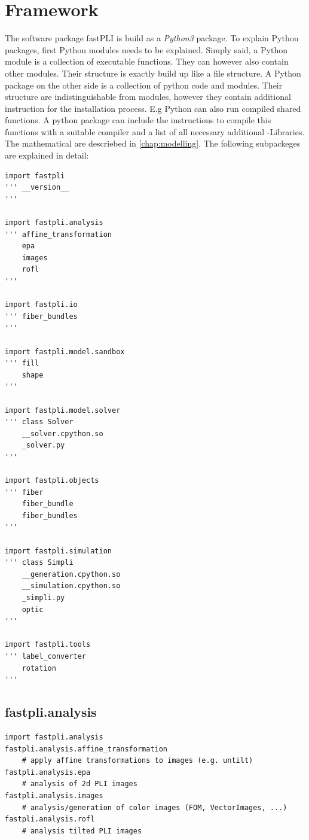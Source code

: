 \section{Framework}
The software package \ac{fastPLI} \cite{fastpli} is build as a \textit{Python3} \cite{Python3} package.
% 
To explain Python packages, first Python modules needs to be explained.
% 
Simply said, a Python module is a collection of executable functions.
They can however also contain other modules.
Their structure is exactly build up like a file structure. 
% 
A Python package on the other side is a collection of python code and modules.
Their structure are indistinguishable from modules, however they contain additional instruction for the installation process.
E.g Python can also run compiled shared \CCXX{} functions.
A python package can include the instructions to compile this functions with a suitable \CCXX{} compiler and a list of all necessary additional \CCXX{}-Libraries.
\\
% 
The mathematical \dummy are descriebed in \cref{chap:modelling}.
The following subpackeges are explained in detail:
% 
\begin{lstfloat}[!t]
\lstset{style=python}
\begin{lstlisting}
import fastpli
''' __version__
'''

import fastpli.analysis
''' affine_transformation
    epa
    images
    rofl
'''

import fastpli.io
''' fiber_bundles
'''

import fastpli.model.sandbox
''' fill
    shape
'''

import fastpli.model.solver
''' class Solver
    __solver.cpython.so
    _solver.py
'''

import fastpli.objects
''' fiber
    fiber_bundle
    fiber_bundles
'''

import fastpli.simulation
''' class Simpli
    __generation.cpython.so
    __simulation.cpython.so
    _simpli.py
    optic
'''

import fastpli.tools
''' label_converter
    rotation
'''
\end{lstlisting}
\caption[Overview \fastpli package]{Overview \fastpli package with containing modules}
\end{lstfloat}
% 
\subsection{fastpli.analysis}
\begin{lstfloat}[!t]
\lstset{style=python}
\begin{lstlisting}
import fastpli.analysis
fastpli.analysis.affine_transformation
    # apply affine transformations to images (e.g. untilt)
fastpli.analysis.epa
    # analysis of 2d PLI images
fastpli.analysis.images
    # analysis/generation of color images (FOM, VectorImages, ...)
fastpli.analysis.rofl
    # analysis tilted PLI images
\end{lstlisting}
\caption{\texttt{fastpli.analysis}}
\end{lstfloat}
% 

